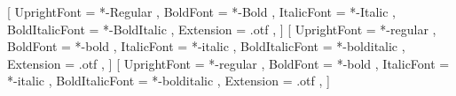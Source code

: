 \setmainfont{TeXGyreTermesX}[
  UprightFont = *-Regular ,
  BoldFont = *-Bold ,
  ItalicFont = *-Italic ,
  BoldItalicFont = *-BoldItalic ,
  Extension = .otf ,
  ]
\setsansfont{texgyreheros}[
  UprightFont = *-regular ,
  BoldFont = *-bold ,
  ItalicFont = *-italic ,
  BoldItalicFont = *-bolditalic ,
  Extension = .otf ,
  ]
\setmonofont{texgyrecursor}[
  UprightFont = *-regular ,
  BoldFont = *-bold ,
  ItalicFont = *-italic ,
  BoldItalicFont = *-bolditalic ,
  Extension = .otf ,
]

\renewcommand{\sum}{\LMsum}
